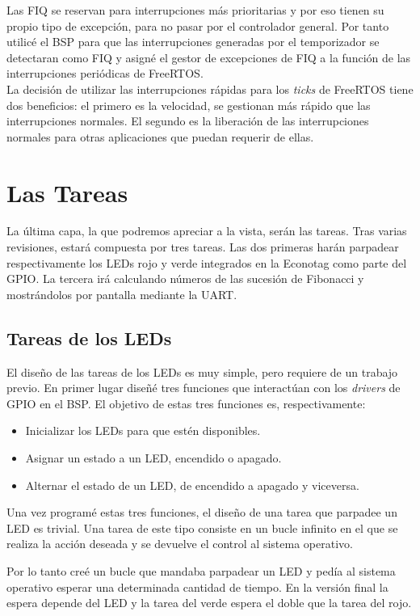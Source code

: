 Las FIQ se reservan para interrupciones más prioritarias y por eso tienen su propio tipo de excepción, para no pasar por el controlador general. Por tanto utilicé el BSP para que las interrupciones generadas por el temporizador se detectaran como FIQ y asigné el gestor de excepciones de FIQ a la función de las interrupciones periódicas de FreeRTOS.\\

La decisión de utilizar las interrupciones rápidas para los \emph{ticks} de FreeRTOS tiene dos beneficios: el primero es la velocidad, se gestionan más rápido que las interrupciones normales. El segundo es la liberación de las interrupciones normales para otras aplicaciones que puedan requerir de ellas.

\section{Las Tareas}
La última capa, la que podremos apreciar a la vista, serán las tareas. Tras varias revisiones, estará compuesta por tres tareas. Las dos primeras harán parpadear respectivamente los LEDs rojo y verde integrados en la Econotag como parte del GPIO. La tercera irá calculando números de las sucesión de Fibonacci y mostrándolos por pantalla mediante la UART.

\subsection{Tareas de los LEDs}
El diseño de las tareas de los LEDs es muy simple, pero requiere de un trabajo previo. En primer lugar diseñé tres funciones que interactúan con los \emph{drivers} de GPIO en el BSP. El objetivo de estas tres funciones es, respectivamente:
\begin{itemize}
    \item Inicializar los LEDs para que estén disponibles.
    \item Asignar un estado a un LED, encendido o apagado.
    \item Alternar el estado de un LED, de encendido a apagado y viceversa.
\end{itemize}

Una vez programé estas tres funciones, el diseño de una tarea que parpadee un LED es trivial. Una tarea de este tipo consiste en un bucle infinito en el que se realiza la acción deseada y se devuelve el control al sistema operativo.

Por lo tanto creé un bucle que mandaba parpadear un LED y pedía al sistema operativo esperar una determinada cantidad de tiempo. En la versión final la espera depende del LED y la tarea del verde espera el doble que la tarea del rojo.

